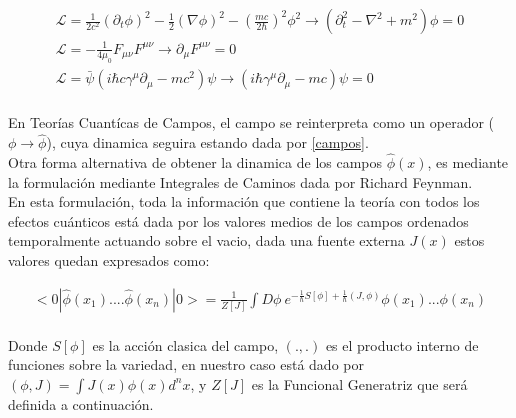 \begin{equation}
\begin{array}{c}
\mathscr{L} = \frac{1}{2 c^2} (\partial _t \phi ) ^2 - \frac{1}{2} (  \nabla \phi ) ^2 - 
	\left( \frac{m c}{2 \hbar}  \right) ^2 \phi ^2 
\rightarrow 
\left(
	\partial _t ^2 - \nabla ^2 + m^2 
		\right) \phi = 0 \\[8pt]
		
\mathscr{L} = - \frac{1}{4 \mu _0} F _{\mu \nu} F ^{\mu \nu}
\rightarrow \partial _{\mu} F ^{\mu \nu} = 0 \\[8pt]

\mathscr{L} =  { \bar{\psi} } \left(
			i \hbar c \gamma ^{\mu} \partial _{\mu} - m c^2 
			\right) \psi 
\rightarrow
			\left( i \hbar  \gamma ^{\mu} \partial _{\mu}  - m c  \right)\psi = 0\\[10pt]
\end{array}
\label{campos}
\end{equation}




En Teorías Cuantícas de Campos, el campo se reinterpreta como un operador ($\phi \rightarrow \hat{\phi}$), cuya dinamica seguira estando dada por \ref{campos}. \\




Otra forma alternativa de obtener la dinamica de los campos $\hat{\phi } (x)$, es mediante la formulación mediante Integrales de Caminos dada por Richard Feynman.\\

En esta formulación, toda la información que contiene la teoría con todos los efectos cuánticos está dada por los valores medios de los campos ordenados temporalmente actuando sobre el vacio, dada una fuente externa $J(x)$ estos valores quedan expresados como:

\begin{equation}
\begin{array}{c}
< 0 | \hat{ \phi  } (x _1) .... \hat{\phi  } (x _n) | 0 > = \frac{1}{Z[J]} 
\int D \phi \ e ^{- \frac{1}{\hbar} S[ \phi ] + \frac{1}{\hbar} (J, \phi )} \phi (x _1) ... \phi (x _n) \\[10pt]
\end{array}
\label{valor}
\end{equation}

Donde $S[\phi]$ es la acción clasica del campo, $(.,.) $ es el producto interno de funciones sobre la variedad, en nuestro caso está dado por $(\phi,J) = \int J(x) \phi (x) d^n x$, y $Z[J]$ es la Funcional Generatriz que será definida a continuación.\\




